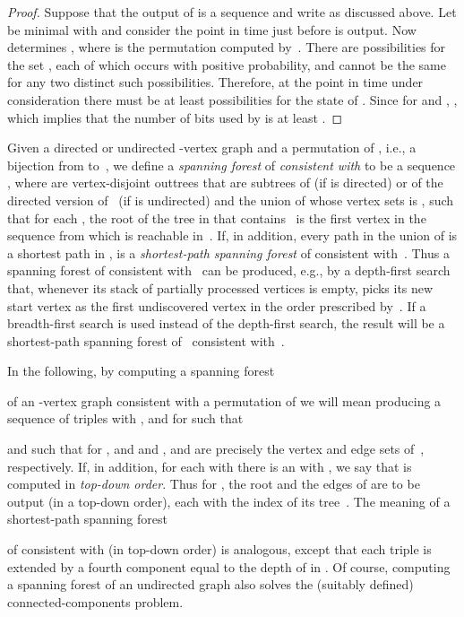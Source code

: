 \documentclass[envcountsame,envcountsect,undated,nolinenumbers]{lnthi}
\begin{document}
\begin{proof}
Suppose that the output of  is a
sequence  and
write 
as discussed above.
Let  be minimal
with 
and consider the point in time just
before  is output.
Now 
determines ,
where  is the permutation computed
by~.
There are
 possibilities
for the set ,
each of which occurs with positive probability,
and  cannot be the same for
any two distinct such possibilities.
Therefore, at the point
in time under consideration there must be
at least  possibilities
for the state of .
Since 
for 
and ,
,
which implies that
the number of bits used by 
is at least
.
\end{proof}

Given a directed or undirected
-vertex graph 
and a permutation 
 of , i.e., a
bijection from  to~,
we define a \emph{spanning forest} of 
\emph{consistent with}  to be a sequence
, where 
are vertex-disjoint outtrees that are
subtrees of 
(if  is directed) or of the directed version of~
(if  is undirected) and the union of whose vertex sets
is , such that for each , the root of
the tree in  that contains~
is the first vertex in the sequence
 from which  is reachable in~.
If, in addition, every path in the union
of 
is a shortest path in ,  is a
\emph{shortest-path spanning forest} of 
consistent with~.
Thus a spanning forest of  consistent with~
can be produced, e.g., by a depth-first search that,
whenever its stack of partially processed vertices
is empty, picks its new start vertex
as the first undiscovered vertex in the order
prescribed by~.
If a breadth-first search is used instead of the
depth-first search, the result will be a
shortest-path spanning forest of~
consistent with~.

In the following, by computing a spanning forest

of an -vertex graph  consistent with
a permutation  of  we will mean producing a
sequence \break of
triples with , 
and  for  such that

and such that for ,
 and  and
,
 and  
are precisely the vertex and edge sets of~,
respectively.
If, in addition, for each 
with  there is an 
with , we say that  is computed in
\emph{top-down order}.
Thus for , the root and
the edges of  are to
be output (in a top-down order),
each with the index  of its tree~.
The meaning of a shortest-path spanning forest

of  consistent with  (in top-down order)
is analogous,
except that each triple 
is extended by a
fourth component equal to the depth of 
in .
Of course, computing a spanning forest of an
undirected graph also solves the
(suitably defined) connected-components
problem.
\end{document}
